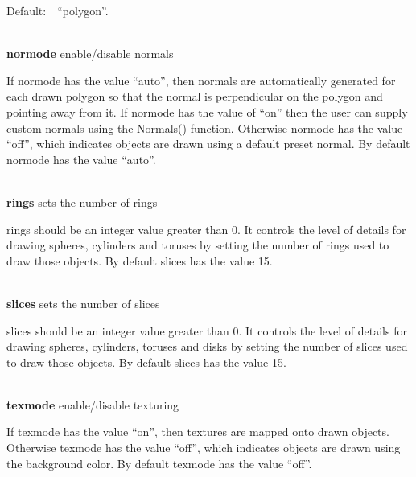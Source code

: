 \documentclass[letterpaper]{article}
\begin{document}
\bigskip

{
Default:\ \ \textsf{{}``polygon''}.}


\bigskip

\noindent\hrulefill\\
\noindent\textsf{\textbf{normode}} \hfill enable/disable normals


\bigskip

{
If normode has the value \textsf{{}``auto'',} then normals are automatically generated for each drawn polygon so that
the normal is perpendicular on the polygon and pointing away from it. If normode has the value of ``on'' then the user
can supply custom normals using the \textsf{Normals()} function. Otherwise normode has the value \textsf{{}``off''},
which indicates objects are drawn using a default preset normal. By default normode has the value \textsf{{}``auto''.}}

\noindent\hrulefill\\
\noindent\textsf{\textbf{rings}} \hfill sets the number of rings


\bigskip

{
rings should be an integer value greater than 0. It controls the level of details for drawing spheres, cylinders and
toruses by setting the number of rings used to draw those objects. By default slices has the value 15\textsf{.}}


\bigskip

\noindent\hrulefill\\
\noindent\textsf{\textbf{slices}} \hfill sets the number of slices


\bigskip

{
slices should be an integer value greater than 0. It controls the level of details for drawing spheres, cylinders,
toruses and disks by setting the number of slices used to draw those objects. By default slices has the value
15\textsf{.}}


\bigskip

\noindent\hrulefill\\
\noindent\textsf{\textbf{texmode}} \hfill enable/disable texturing


\bigskip

If texmode has the value \textsf{{}``on'',} then textures are mapped
onto drawn objects. Otherwise texmode has the value
\textsf{{}``off''}, which indicates objects are drawn using the
background color. By default texmode has the value \textsf{{}``off''.}
\end{document}

